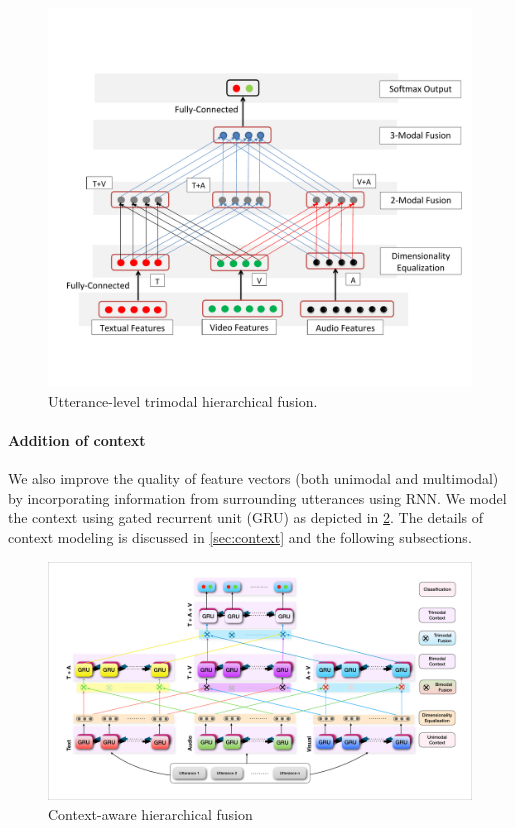 \documentclass[review]{elsarticle}
\newcommand\?[1]{\hl{#1}}
\begin{document}
\begin{figure}[ht]
    \centering
    \includegraphics[scale=0.46]{./hfusion-Gelbukh-trimmed.pdf}
    \caption{Utterance-level trimodal hierarchical fusion.\protect\footnotemark}
    \label{fig:hfusion-trimodal}
\end{figure}

\paragraph{Addition of context}
We also improve the quality of feature vectors (both unimodal and multimodal) by
incorporating information from surrounding utterances using RNN. We model the
context using gated recurrent unit (GRU) as depicted in \cref{fig:architecture}.
The details of context modeling is discussed in \cref{sec:context} and the
following subsections.

\begin{figure}[ht]
    \centering
    \includegraphics[width=\textwidth]{./chfusion.pdf}
    \caption{Context-aware hierarchical fusion}
    \label{fig:architecture}
\end{figure}
\end{document}
